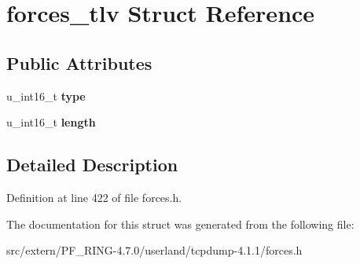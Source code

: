 \hypertarget{structforces__tlv}{
\section{forces\_\-tlv Struct Reference}
\label{structforces__tlv}
}
\subsection*{Public Attributes}
\begin{DoxyCompactItemize}
\item 
\hypertarget{structforces__tlv_a2d293b4a3f8717bd1dbefb38e1782c5f}{
u\_\-int16\_\-t {\bfseries type}}
\label{structforces__tlv_a2d293b4a3f8717bd1dbefb38e1782c5f}

\item 
\hypertarget{structforces__tlv_a3101d9d4343475b142c2dd5cc9efd2bc}{
u\_\-int16\_\-t {\bfseries length}}
\label{structforces__tlv_a3101d9d4343475b142c2dd5cc9efd2bc}

\end{DoxyCompactItemize}


\subsection{Detailed Description}


Definition at line 422 of file forces.h.



The documentation for this struct was generated from the following file:\begin{DoxyCompactItemize}
\item 
src/extern/PF\_\-RING-\/4.7.0/userland/tcpdump-\/4.1.1/forces.h\end{DoxyCompactItemize}
